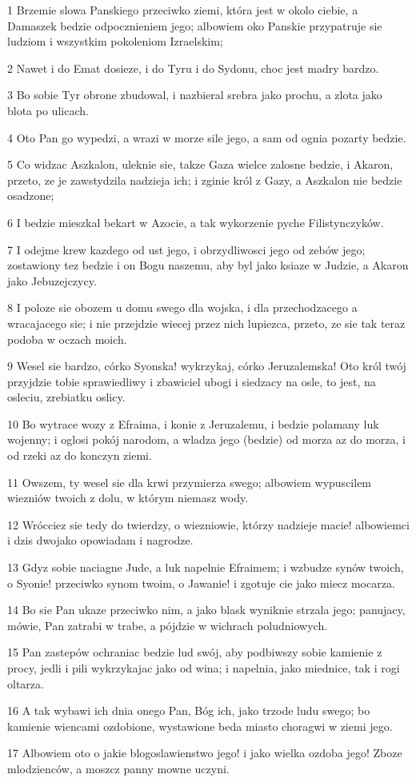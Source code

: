 \par 1 Brzemie slowa Panskiego przeciwko ziemi, która jest w okolo ciebie, a Damaszek bedzie odpocznieniem jego; albowiem oko Panskie przypatruje sie ludziom i wszystkim pokoleniom Izraelskim;
\par 2 Nawet i do Emat dosieze, i do Tyru i do Sydonu, choc jest madry bardzo.
\par 3 Bo sobie Tyr obrone zbudowal, i nazbieral srebra jako prochu, a zlota jako blota po ulicach.
\par 4 Oto Pan go wypedzi, a wrazi w morze sile jego, a sam od ognia pozarty bedzie.
\par 5 Co widzac Aszkalon, uleknie sie, takze Gaza wielce zalosne bedzie, i Akaron, przeto, ze je zawstydzila nadzieja ich; i zginie król z Gazy, a Aszkalon nie bedzie osadzone;
\par 6 I bedzie mieszkal bekart w Azocie, a tak wykorzenie pyche Filistynczyków.
\par 7 I odejme krew kazdego od ust jego, i obrzydliwosci jego od zebów jego; zostawiony tez bedzie i on Bogu naszemu, aby byl jako ksiaze w Judzie, a Akaron jako Jebuzejczycy.
\par 8 I poloze sie obozem u domu swego dla wojska, i dla przechodzacego a wracajacego sie; i nie przejdzie wiecej przez nich lupiezca, przeto, ze sie tak teraz podoba w oczach moich.
\par 9 Wesel sie bardzo, córko Syonska! wykrzykaj, córko Jeruzalemska! Oto król twój przyjdzie tobie sprawiedliwy i zbawiciel ubogi i siedzacy na osle, to jest, na osleciu, zrebiatku oslicy.
\par 10 Bo wytrace wozy z Efraima, i konie z Jeruzalemu, i bedzie polamany luk wojenny; i oglosi pokój narodom, a wladza jego (bedzie) od morza az do morza, i od rzeki az do konczyn ziemi.
\par 11 Owszem, ty wesel sie dla krwi przymierza swego; albowiem wypuscilem wiezniów twoich z dolu, w którym niemasz wody.
\par 12 Wrócciez sie tedy do twierdzy, o wiezniowie, którzy nadzieje macie! albowiemci i dzis dwojako opowiadam i nagrodze.
\par 13 Gdyz sobie naciagne Jude, a luk napelnie Efraimem; i wzbudze synów twoich, o Syonie! przeciwko synom twoim, o Jawanie! i zgotuje cie jako miecz mocarza.
\par 14 Bo sie Pan ukaze przeciwko nim, a jako blask wyniknie strzala jego; panujacy, mówie, Pan zatrabi w trabe, a pójdzie w wichrach poludniowych.
\par 15 Pan zastepów ochraniac bedzie lud swój, aby podbiwszy sobie kamienie z procy, jedli i pili wykrzykajac jako od wina; i napelnia, jako miednice, tak i rogi oltarza.
\par 16 A tak wybawi ich dnia onego Pan, Bóg ich, jako trzode ludu swego; bo kamienie wiencami ozdobione, wystawione beda miasto choragwi w ziemi jego.
\par 17 Albowiem oto o jakie blogoslawienstwo jego! i jako wielka ozdoba jego! Zboze mlodzienców, a moszcz panny mowne uczyni.

